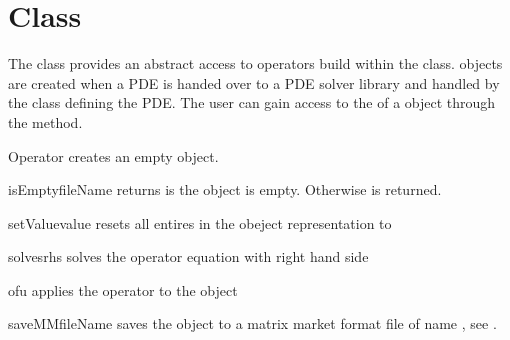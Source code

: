 \section{\Operator Class}

The \Operator class provides an abstract access to operators build
within the \LinearPDE class. \Operator objects are created 
when a PDE is handed over to a PDE solver library and handled
by the \LinearPDE class defining the PDE. The user can gain access
to the \Operator of a \LinearPDE object through the 
method.

\begin{classdesc}{Operator}{}
creates an empty \Operator object.
\end{classdesc}

\begin{methoddesc}[Operator]{isEmpty}{fileName}
returns \True is the object is empty. Otherwise \True is returned.
\end{methoddesc}

\begin{methoddesc}[Operator]{setValue}{value}
resets all entires in the obeject representation to 
\end{methoddesc}

\begin{methoddesc}[Operator]{solves}{rhs}
solves the operator equation with right hand side 
\end{methoddesc}

\begin{methoddesc}[Operator]{of}{u}
applies the operator to the \Data object 
\end{methoddesc}

\begin{methoddesc}[Operator]{saveMM}{fileName}
saves the object to a matrix market format file of name
, see
.
\end{methoddesc}

